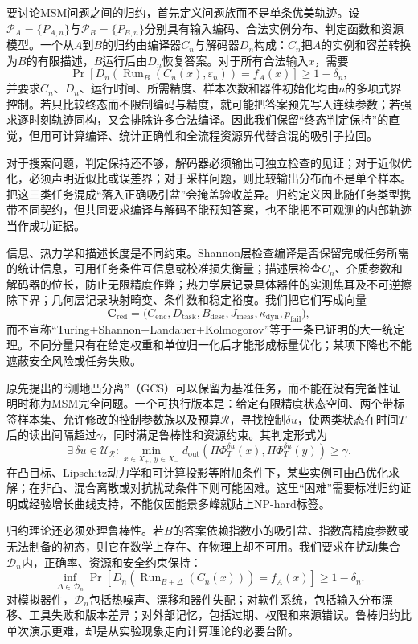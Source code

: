 要讨论MSM问题之间的归约，首先定义问题族而不是单条优美轨迹。设$\mathcal P_A=\{P_{A,n}\}$与$\mathcal P_B=\{P_{B,n}\}$分别具有输入编码、合法实例分布、判定函数和资源模型。一个从$A$到$B$的归约由编译器$C_n$与解码器$D_n$构成：$C_n$把$A$的实例和容差转换为$B$的有限描述，$B$运行后由$D_n$恢复答案。对于所有合法输入$x$，需要
\[
\Pr\!\left[
D_n\!\left(\operatorname{Run}_B(C_n(x),\varepsilon_n)\right)
=f_A(x)
\right]\ge 1-\delta_n ,
\]
并要求$C_n$、$D_n$、运行时间、所需精度、样本次数和器件初始化均由$n$的多项式界控制。若只比较终态而不限制编码与精度，就可能把答案预先写入连续参数；若强求逐时刻轨迹同构，又会排除许多合法编译。因此我们保留“终态判定保持”的直觉，但用可计算编译、统计正确性和全流程资源界代替含混的吸引子拉回。

对于搜索问题，判定保持还不够，解码器必须输出可独立检查的见证；对于近似优化，必须声明近似比或误差界；对于采样问题，则比较输出分布而不是单个样本。把这三类任务混成“落入正确吸引盆”会掩盖验收差异。归约定义因此随任务类型携带不同契约，但共同要求编译与解码不能预知答案，也不能把不可观测的内部轨迹当作成功证据。

信息、热力学和描述长度是不同约束。Shannon层检查编译是否保留完成任务所需的统计信息，可用任务条件互信息或校准损失衡量；描述层检查$C_n$、介质参数和解码器的位长，防止无限精度作弊；热力学层记录具体器件的实测焦耳及不可逆擦除下界；几何层记录映射畸变、条件数和稳定裕度。我们把它们写成向量
\[
\mathbf C_{\mathrm{red}}=
\bigl(C_{\mathrm{enc}},D_{\mathrm{task}},B_{\mathrm{desc}},
J_{\mathrm{meas}},\kappa_{\mathrm{dyn}},p_{\mathrm{fail}}\bigr),
\]
而不宣称“Turing+Shannon+Landauer+Kolmogorov”等于一条已证明的大一统定理。不同分量只有在给定权重和单位归一化后才能形成标量优化；某项下降也不能遮蔽安全风险或任务失败。

原先提出的“测地凸分离”（GCS）可以保留为基准任务，而不能在没有完备性证明时称为MSM完全问题。一个可执行版本是：给定有限精度状态空间、两个带标签样本集、允许修改的控制参数族以及预算$\mathcal R$，寻找控制$\delta u$，使两类状态在时间$T$后的读出间隔超过$\gamma$，同时满足鲁棒性和资源约束。其判定形式为
\[
\exists\,\delta u\in\mathcal U_{\mathcal R}:
\min_{x\in X_+,\,y\in X_-}
d_{\mathrm{out}}\!\left(
\Pi\Phi_T^{\delta u}(x),
\Pi\Phi_T^{\delta u}(y)
\right)\ge\gamma .
\]
在凸目标、Lipschitz动力学和可计算投影等附加条件下，某些实例可由凸优化求解；在非凸、混合离散或对抗扰动条件下则可能困难。这里“困难”需要标准归约证明或经验增长曲线支持，不能仅因能景多峰就贴上NP-hard标签。

归约理论还必须处理鲁棒性。若$B$的答案依赖指数小的吸引盆、指数高精度参数或无法制备的初态，则它在数学上存在、在物理上却不可用。我们要求在扰动集合$\mathcal D_n$内，正确率、资源和安全约束保持：
\[
\inf_{\Delta\in\mathcal D_n}
\Pr\!\left[D_n(\operatorname{Run}_{B+\Delta}(C_n(x)))=f_A(x)\right]
\ge 1-\delta_n .
\]
对模拟器件，$\mathcal D_n$包括热噪声、漂移和器件失配；对软件系统，包括输入分布漂移、工具失败和版本差异；对外部记忆，包括过期、权限和来源错误。鲁棒归约比单次演示更难，却是从实验现象走向计算理论的必要台阶。

